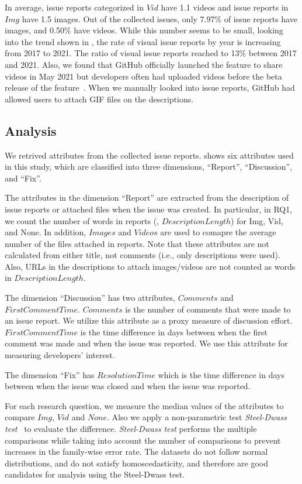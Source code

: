
In average, issue reports categorized in $Vid$ have 1.1 videos and issue reports in $Img$ have 1.5 images.  
Out of the collected issues, only 7.97\% of issue reports have images, and 0.50\% have videos. 
While this number seems to be small, looking into the trend shown in , the rate of visual issue reports by year is increasing from 2017 to 2021. 
The ratio of visual issue reports reached to 13\% between 2017 and 2021. 
Also, we found that GitHub officially launched the feature to share videos in May 2021 but developers often had uploaded videos before the beta release of the feature~\citep{github-video-blog-beta}. 
When we manually looked into issue reports, GitHub had allowed users to attach GIF files on the descriptions.

% 
%

\subsection{Analysis}
 We retrived attributes from the collected issue reports.  shows six attributes used in this study, which are classified into three dimensions, ``Report'', ``Discussion'', and ``Fix''. 

The attributes in the dimension ``Report'' are extracted from the description of issue reports or attached files when the issue was created. 
In particular, in RQ1, we count the number of words in reports (\ie, $DescriptionLength$) for Img, Vid, and None. 
In addition,  $Images$ and $Videos$ are used to comapre the average number of the files attached in reports. 
Note that these attributes are not calculated from either title, not comments (i.e., only descriptions were used). Also, URLs in the descriptions to attach images/videos are not counted as words in $DescriptionLength$.

The dimension ``Discussion'' has two attributes, $Comments$ and $FirstCommentTime$. 
$Comments$ is the number of comments that were made to an issue report. 
We utilize this attribute as a proxy measure of discussion effort. $FirstCommentTime$ is the time difference in days between when the first comment was made and when the issue was reported. 
We use this attribute for measuring developers' interest. 

The dimension ``Fix'' has $ResolutionTime$ which is the time difference in days between when the issue was closed and when the issue was reported. 

 For each research question, we measure the median values of the attributes to compare $Img$, $Vid$ and $None$. 
Also we apply a non-parametric test \textit{Steel-Dwass test}~\citep{steel-dwass-test} to evaluate the difference. 
\textit{Steel-Dwass test} performs the multiple comparisons while taking into account the number of comparisons to prevent increases in the family-wise error rate.
The datasets do not follow normal distributions, and do not satisfy homoscedasticity, and therefore are good candidates for analysis using the Steel-Dwass test. 
